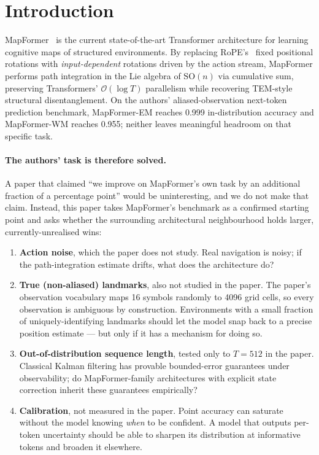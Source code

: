 \section{Introduction}
\label{sec:intro}

MapFormer~\citep{rambaud2025mapformer} is the current state-of-the-art
Transformer architecture for learning cognitive maps of structured
environments. By replacing RoPE's~\citep{su2021roformer} fixed positional
rotations with \emph{input-dependent} rotations driven by the action stream,
MapFormer performs path integration in the Lie algebra of $\mathrm{SO}(n)$ via
cumulative sum, preserving Transformers' $\mathcal{O}(\log T)$ parallelism
while recovering TEM-style~\citep{whittington2022tem-t} structural
disentanglement. On the authors' aliased-observation next-token prediction
benchmark, MapFormer-EM reaches 0.999 in-distribution accuracy and
MapFormer-WM reaches 0.955; neither leaves meaningful headroom on that
specific task.

\paragraph{The authors' task is therefore solved.} A paper that claimed ``we
improve on MapFormer's own task by an additional fraction of a percentage
point'' would be uninteresting, and we do not make that claim. Instead, this
paper takes MapFormer's benchmark as a confirmed starting point and asks
whether the surrounding architectural neighbourhood holds larger,
currently-unrealised wins:

\begin{enumerate}
  \item \textbf{Action noise}, which the paper does not study. Real
  navigation is noisy; if the path-integration estimate drifts, what does the
  architecture do?
  \item \textbf{True (non-aliased) landmarks}, also not studied in the paper.
  The paper's observation vocabulary maps 16 symbols randomly to 4096 grid
  cells, so every observation is ambiguous by construction. Environments
  with a small fraction of uniquely-identifying landmarks should let the
  model snap back to a precise position estimate --- but only if it has a
  mechanism for doing so.
  \item \textbf{Out-of-distribution sequence length}, tested only to $T{=}512$
  in the paper. Classical Kalman filtering has provable bounded-error
  guarantees under observability; do MapFormer-family architectures with
  explicit state correction inherit these guarantees empirically?
  \item \textbf{Calibration}, not measured in the paper. Point accuracy can
  saturate without the model knowing \emph{when} to be confident. A model
  that outputs per-token uncertainty should be able to sharpen its
  distribution at informative tokens and broaden it elsewhere.
\end{enumerate}

